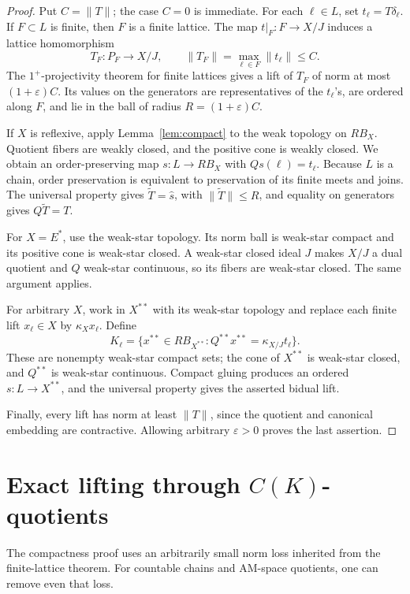 \documentclass[11pt]{article}
\begin{document}
\begin{proof}
Put \(C=\|T\|\); the case \(C=0\) is immediate.  For each \(\ell\in L\),
set \(t_\ell=T\delta_\ell\).  If \(F\subset L\) is finite, then \(F\) is a
finite lattice.  The map \(t|_F:F\to X/J\) induces a lattice homomorphism
\[
 T_F:P_F\longrightarrow X/J,\qquad
 \|T_F\|=\max_{\ell\in F}\|t_\ell\|\le C.
\]
The \(1^+\)-projectivity theorem for finite lattices gives a lift of
\(T_F\) of norm at most \((1+\varepsilon)C\).  Its values on the
generators are representatives of the \(t_\ell\)'s, are ordered along
\(F\), and lie in the ball of radius
\(R=(1+\varepsilon)C\).

If \(X\) is reflexive, apply Lemma~\ref{lem:compact} to the weak topology
on \(RB_X\).  Quotient fibers are weakly closed, and the positive cone is
weakly closed.  We obtain an order-preserving map \(s:L\to RB_X\) with
\(Qs(\ell)=t_\ell\).  Because \(L\) is a chain, order preservation is
equivalent to preservation of its finite meets and joins.  The universal
property gives \(\widetilde T=\widehat s\), with
\(\|\widetilde T\|\le R\), and equality on generators gives
\(Q\widetilde T=T\).

For \(X=E^*\), use the weak-star topology.  Its norm ball is weak-star
compact and its positive cone is weak-star closed.  A weak-star closed
ideal \(J\) makes \(X/J\) a dual quotient and \(Q\) weak-star continuous,
so its fibers are weak-star closed.  The same argument applies.

For arbitrary \(X\), work in \(X^{**}\) with its weak-star topology and
replace each finite lift \(x_\ell\in X\) by
\(\kappa_Xx_\ell\).  Define
\[
 K_\ell=\{x^{**}\in RB_{X^{**}}:
 Q^{**}x^{**}=\kappa_{X/J}t_\ell\}.
\]
These are nonempty weak-star compact sets; the cone of \(X^{**}\) is
weak-star closed, and \(Q^{**}\) is weak-star continuous.  Compact
gluing produces an ordered \(s:L\to X^{**}\), and the universal property
gives the asserted bidual lift.

Finally, every lift has norm at least \(\|T\|\), since the quotient and
canonical embedding are contractive.  Allowing arbitrary
\(\varepsilon>0\) proves the last assertion.
\end{proof}

\section{Exact lifting through \texorpdfstring{\(C(K)\)}{C(K)}-quotients}

The compactness proof uses an arbitrarily small norm loss inherited from
the finite-lattice theorem.  For countable chains and AM-space quotients,
one can remove even that loss.
\end{document}
